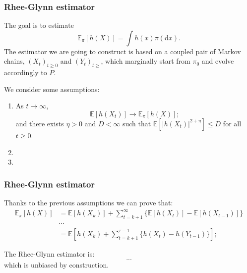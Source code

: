 \documentclass[9pt]{beamer}
\begin{document}
	
	\begin{frame}
		\frametitle{Rhee-Glynn estimator}
		The goal is to estimate
		$$
			\mathbb{E}_{\pi}[h(X)] 
			= \int h(x) \pi (\text{d}x)
		.
		$$
		The estimator we are going to construct is based on a coupled pair of Markov chains, $(X_t)_{t\geq 0}$ and $(Y_t)_{t\geq}$, which marginally start from $\pi_0$ and evolve accordingly to $P$.
		
		We consider some assumptions:
		\begin{enumerate}
			\item As $t \to \infty$, 
			$$ \mathbb E [h(X_t)] \to \mathbb E_\pi [h(X)];$$
			and there exists $\eta > 0$ and $D < \infty$ such that $\mathbb E [|h(X_t)|^{2 + \eta}] \leq D$ for all $t \geq 0$. 
			\item
			\item
		\end{enumerate}

	\end{frame}
	\begin{frame}
			\frametitle{Rhee-Glynn estimator}
	Thanks to the previous assumptions we can prove that:
	\begin{align*}
		\mathbb{E}_{\pi}[h(X)] 
		& = \mathbb{E}[h(X_k)] + \sum_{t = k+1}^\infty\{\mathbb{E}[h(X_t)] - \mathbb{E}[h(X_{t-1})]\} \\
		& \cdots\\
		&  = \mathbb{E}[h(X_k) + \sum_{t = k+1}^{\tau -1}\{h(X_t) - h(Y_{t-1})\} ]
	;
	\end{align*}
	
	The Rhee-Glynn estimator is:
	$$ ...
	$$
	which is unbiased by construction.
	
	\end{frame}
\end{document}
